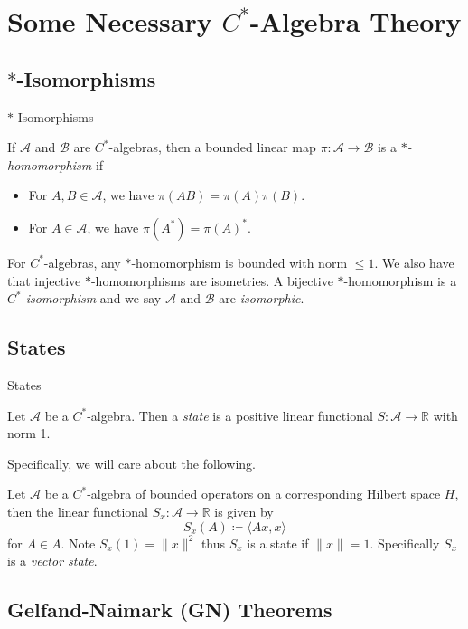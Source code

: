 \documentclass[pdf]{beamer}
\theoremstyle{definition}
\theoremstyle{theorem}
\newcommand{\R}{\mathbb{R}}
\newcommand{\A}{\mathcal{A}}
\begin{document}
\section{Some Necessary $C^*$-Algebra Theory}
\subsection{$*$-Isomorphisms}
	\begin{frame}{$*$-Isomorphisms}
	\begin{definition}
	If $\A$ and $\mathcal{B}$ are $C^*$-algebras, then a bounded linear map $\pi\colon \A \to \mathcal{B}$ is a \emph{$*$-homomorphism} if
	\begin{itemize}
	\item For $A,B\in \A$, we have $\pi(AB)=\pi(A)\pi(B)$.
	\item For $A\in \A$, we have $\pi(A^*)=\pi(A)^*$.
	\end{itemize}
	\end{definition}
	For $C^*$-algebras, any $*$-homomorphism is bounded with norm $\leq 1$. We also have that injective $*$-homomorphisms are isometries.  A bijective $*$-homomorphism is a \emph{$C^*$-isomorphism} and we say $\A$ and $\mathcal{B}$ are \emph{isomorphic}.
	\end{frame}


\subsection{States}

	\begin{frame}{States}
	\begin{definition}
	Let $\A$ be a $C^*$-algebra. Then a \emph{state} is a positive linear functional $S\colon \A \to \R$ with norm 1. 
	\end{definition}
	Specifically, we will care about the following.
	\begin{definition}
	Let $\A$ be a $C^*$-algebra of bounded operators on a corresponding Hilbert space $H$, then the linear functional $S_x \colon \A \to \R$ is given by 
	\[
	S_x(A)\coloneqq \langle Ax,x \rangle
	\]
	for $A\in A$. Note $S_x(1)=\|x\|^2$ thus $S_x$ is a state if $\|x\|=1$. Specifically $S_x$ is a \emph{vector state}.
	\end{definition}
	\end{frame}
	
\subsection{Gelfand-Naimark (GN) Theorems}
\end{document}
